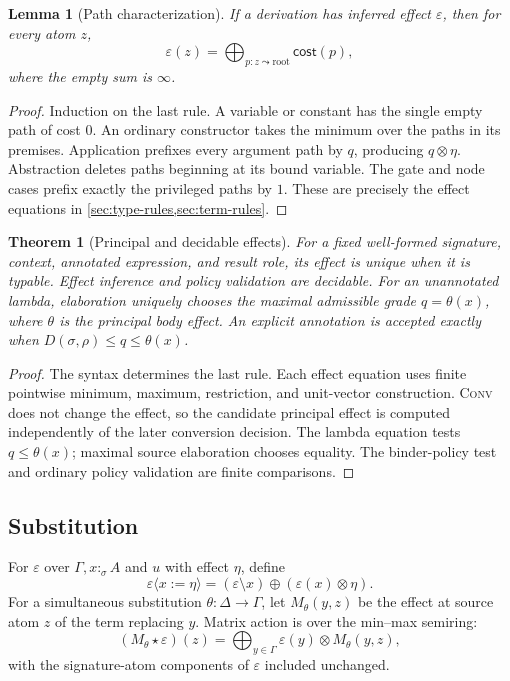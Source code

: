 \documentclass[11pt]{article}
\numberwithin{equation}{section}
\theoremstyle{definition}
\theoremstyle{plain}
\newtheorem{theorem}[definition]{Theorem}
\newtheorem{lemma}[definition]{Lemma}
\theoremstyle{remark}
\newcommand{\eps}{\varepsilon}
\newcommand{\cost}{\mathsf{cost}}
\newcommand{\absent}{\boldsymbol\infty}
\begin{document}
\begin{lemma}[Path characterization]\label{lem:path-characterization}
If a derivation has inferred effect \(\eps\), then for every atom \(z\),
\[
 \eps(z)=\bigoplus_{p:z\leadsto\mathrm{root}}\cost(p),
\]
where the empty sum is \(\absent\).
\end{lemma}

\begin{proof}
Induction on the last rule.  A variable or constant has the single empty path
of cost \(0\).  An ordinary constructor takes the minimum over the paths in
its premises.  Application prefixes every argument path by \(q\), producing
\(q\otimes\eta\).  Abstraction deletes paths beginning at its bound variable.
The gate and node cases prefix exactly the privileged paths by \(1\).  These
are precisely the effect equations in \cref{sec:type-rules,sec:term-rules}.
\end{proof}

\begin{theorem}[Principal and decidable effects]\label{thm:principal}
For a fixed well-formed signature, context, annotated expression, and result
role, its effect is unique when it is typable.  Effect inference and policy
validation are decidable.  For an unannotated lambda, elaboration uniquely
chooses the maximal admissible grade \(q=\theta(x)\), where \(\theta\) is the
principal body effect.  An explicit annotation is accepted exactly when
\(D(\sigma,\rho)\le q\le\theta(x)\).
\end{theorem}

\begin{proof}
The syntax determines the last rule.  Each effect equation uses finite
pointwise minimum, maximum, restriction, and unit-vector construction.
\textsc{Conv} does not change the effect, so the candidate principal effect is
computed independently of the later conversion decision.  The lambda equation
tests \(q\le\theta(x)\); maximal source elaboration chooses equality.  The
binder-policy test and ordinary policy validation are finite comparisons.
\end{proof}

\subsection{Substitution}

For \(\eps\) over \(\Gamma,x:_{\sigma}A\) and \(u\) with effect \(\eta\),
define
\begin{equation}\label{eq:single-subst}
  \eps\langle x:=\eta\rangle
  = (\eps\setminus x)\oplus(\eps(x)\otimes\eta).
\end{equation}
For a simultaneous substitution
\(\theta:\Delta\to\Gamma\), let \(M_\theta(y,z)\) be the effect at source
atom \(z\) of the term replacing \(y\).  Matrix action is over the min--max
semiring:
\begin{equation}\label{eq:matrix-subst}
 (M_\theta\star\eps)(z)
 =\bigoplus_{y\in\Gamma}\eps(y)\otimes M_\theta(y,z),
\end{equation}
with the signature-atom components of \(\eps\) included unchanged.
\end{document}
